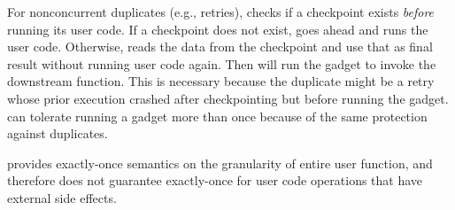 
For nonconcurrent duplicates (e.g., retries), \name{} checks if a checkpoint
exists \emph{before} running its user code. If a checkpoint does not exist,
\name{} goes ahead and runs the user code. Otherwise, \name{} reads the data
from the checkpoint and use that as final result without running user code
again. Then \name{} will run the gadget to invoke the downstream function.
This is necessary because the duplicate might be a retry whose prior execution
crashed after checkpointing but before running the gadget. \name{} can
tolerate running a gadget more than once because of the same protection
against duplicates.

\name{} provides exactly-once semantics on the granularity of entire user
function, and therefore does not guarantee exactly-once for user code
operations that have external side effects.
